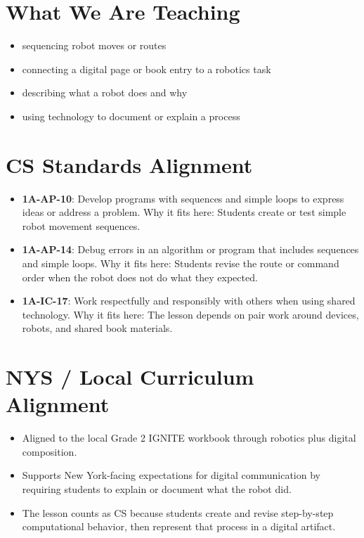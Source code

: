 \documentclass[11pt]{article}
\begin{document}
\section*{What We Are Teaching}
\begin{itemize}[leftmargin=*]
\item sequencing robot moves or routes
\item connecting a digital page or book entry to a robotics task
\item describing what a robot does and why
\item using technology to document or explain a process
\end{itemize}

\section*{CS Standards Alignment}
\begin{itemize}[leftmargin=*]
\item \textbf{1A-AP-10}: Develop programs with sequences and simple loops to express ideas or address a problem. Why it fits here: Students create or test simple robot movement sequences.
\item \textbf{1A-AP-14}: Debug errors in an algorithm or program that includes sequences and simple loops. Why it fits here: Students revise the route or command order when the robot does not do what they expected.
\item \textbf{1A-IC-17}: Work respectfully and responsibly with others when using shared technology. Why it fits here: The lesson depends on pair work around devices, robots, and shared book materials.
\end{itemize}

\section*{NYS / Local Curriculum Alignment}
\begin{itemize}[leftmargin=*]
\item Aligned to the local Grade 2 IGNITE workbook through robotics plus digital composition.
\item Supports New York-facing expectations for digital communication by requiring students to explain or document what the robot did.
\item The lesson counts as CS because students create and revise step-by-step computational behavior, then represent that process in a digital artifact.
\end{itemize}
\end{document}
